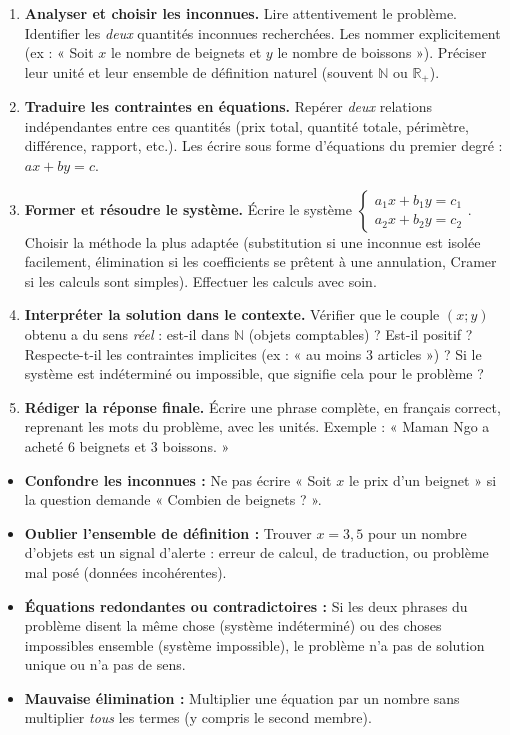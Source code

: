 \documentclass[11pt]{article}
\begin{document}
\begin{methode}
\begin{enumerate}
    \item \textbf{Analyser et choisir les inconnues.} Lire attentivement le problème. Identifier les \emph{deux} quantités inconnues recherchées. Les nommer explicitement (ex : « Soit $x$ le nombre de beignets et $y$ le nombre de boissons »). Préciser leur unité et leur ensemble de définition naturel (souvent $\mathbb{N}$ ou $\mathbb{R}_+$).
    \item \textbf{Traduire les contraintes en équations.} Repérer \emph{deux} relations indépendantes entre ces quantités (prix total, quantité totale, périmètre, différence, rapport, etc.). Les écrire sous forme d'équations du premier degré : $ax + by = c$.
    \item \textbf{Former et résoudre le système.} Écrire le système $\begin{cases} a_1x+b_1y=c_1 \\ a_2x+b_2y=c_2 \end{cases}$. Choisir la méthode la plus adaptée (substitution si une inconnue est isolée facilement, élimination si les coefficients se prêtent à une annulation, Cramer si les calculs sont simples). Effectuer les calculs avec soin.
    \item \textbf{Interpréter la solution dans le contexte.} Vérifier que le couple $(x;y)$ obtenu a du sens \emph{réel} : est-il dans $\mathbb{N}$ (objets comptables) ? Est-il positif ? Respecte-t-il les contraintes implicites (ex : « au moins 3 articles ») ? Si le système est indéterminé ou impossible, que signifie cela pour le problème ?
    \item \textbf{Rédiger la réponse finale.} Écrire une phrase complète, en français correct, reprenant les mots du problème, avec les unités. Exemple : « Maman Ngo a acheté 6 beignets et 3 boissons. »
\end{enumerate}
\end{methode}

\begin{attention}
\begin{itemize}
    \item \textbf{Confondre les inconnues :} Ne pas écrire « Soit $x$ le prix d'un beignet » si la question demande « Combien de beignets ? ».
    \item \textbf{Oublier l'ensemble de définition :} Trouver $x = 3,5$ pour un nombre d'objets est un signal d'alerte : erreur de calcul, de traduction, ou problème mal posé (données incohérentes).
    \item \textbf{Équations redondantes ou contradictoires :} Si les deux phrases du problème disent la même chose (système indéterminé) ou des choses impossibles ensemble (système impossible), le problème n'a pas de solution unique ou n'a pas de sens.
    \item \textbf{Mauvaise élimination :} Multiplier une équation par un nombre sans multiplier \emph{tous} les termes (y compris le second membre).
\end{itemize}
\end{attention}
\end{document}
